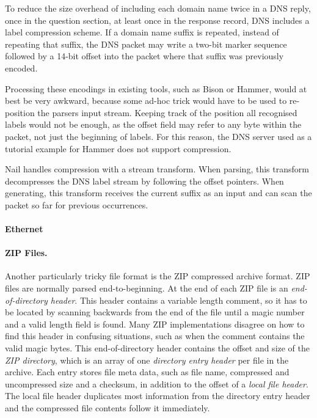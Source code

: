 To reduce the size overhead of including each domain name twice in a DNS reply, once in the
question section, at least once in the response record, DNS includes a label compression scheme. If
a domain name suffix is repeated, instead of repeating that suffix, the DNS packet may write a
two-bit marker sequence followed by a 14-bit offset into the packet where that suffix was previously
encoded.

Processing these encodings in existing tools, such as Bison or Hammer, would at best be very
awkward, because some ad-hoc trick would have to be used to re-position the parsers input stream.
Keeping track of the position all recognised labels would not be enough, as the offset field may
refer to any byte within the packet, not just the beginning of labels. For this reason, the DNS
server used as a tutorial example for Hammer does not support compression.

Nail handles compression with a stream transform. When parsing, this transform decompresses the DNS
label stream by following the offset pointers. When generating, this transform receives the current
suffix as an input and can scan the packet so far for previous occurrences. 


\paragraph{Ethernet}
\XXX[TODO]
\paragraph{ZIP Files.}

Another particularly tricky file format is the ZIP compressed archive format\cite{pkzip}.
ZIP files are normally parsed end-to-beginning. At the end of each ZIP file is an \emph{end-of-directory
header}. This header contains a variable length comment, so it has to be located by scanning
backwards from the end of the file until a magic number and a valid length field is found. Many ZIP
implementations disagree on how to find this header in confusing situations, such as when the
comment contains the valid magic bytes\cite{wolf-berlinsides-zip}.
This end-of-directory header contains the offset and size of the \emph{ZIP directory}, which is an
array of one \emph{directory entry header} per file in the archive.
Each entry stores file meta data, such as file name, compressed and uncompressed size and a checksum,
in addition to the offset of a \emph{local file header}. The local file header duplicates most
information from the directory entry header and the compressed file contents follow it immediately.

